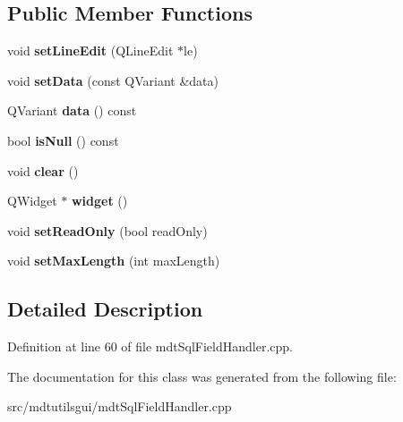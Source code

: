 \subsection*{Public Member Functions}
\begin{DoxyCompactItemize}
\item 
\hypertarget{classmdt_sql_field_handler_line_edit_a2b4477f48226a6e69faf3e3040da63b1}{
void {\bfseries setLineEdit} (QLineEdit $\ast$le)}
\label{classmdt_sql_field_handler_line_edit_a2b4477f48226a6e69faf3e3040da63b1}

\item 
\hypertarget{classmdt_sql_field_handler_line_edit_aabd6a72556f2389b9ea8cac1d26c0479}{
void {\bfseries setData} (const QVariant \&data)}
\label{classmdt_sql_field_handler_line_edit_aabd6a72556f2389b9ea8cac1d26c0479}

\item 
\hypertarget{classmdt_sql_field_handler_line_edit_a0c6a7f100ecadc373c55d2c590044da4}{
QVariant {\bfseries data} () const }
\label{classmdt_sql_field_handler_line_edit_a0c6a7f100ecadc373c55d2c590044da4}

\item 
\hypertarget{classmdt_sql_field_handler_line_edit_ad492eab28cb88bfe623ec3af04aeeb1f}{
bool {\bfseries isNull} () const }
\label{classmdt_sql_field_handler_line_edit_ad492eab28cb88bfe623ec3af04aeeb1f}

\item 
\hypertarget{classmdt_sql_field_handler_line_edit_ad41a3af3230333d74ac688a5e91354b4}{
void {\bfseries clear} ()}
\label{classmdt_sql_field_handler_line_edit_ad41a3af3230333d74ac688a5e91354b4}

\item 
\hypertarget{classmdt_sql_field_handler_line_edit_a475426ca27aea03d01f31c7d9c8bb5ba}{
QWidget $\ast$ {\bfseries widget} ()}
\label{classmdt_sql_field_handler_line_edit_a475426ca27aea03d01f31c7d9c8bb5ba}

\item 
\hypertarget{classmdt_sql_field_handler_line_edit_ab282e2ce51a42e55286111089526b6bb}{
void {\bfseries setReadOnly} (bool readOnly)}
\label{classmdt_sql_field_handler_line_edit_ab282e2ce51a42e55286111089526b6bb}

\item 
\hypertarget{classmdt_sql_field_handler_line_edit_a5a7599a112fd4d74ff0d50cb72e5998c}{
void {\bfseries setMaxLength} (int maxLength)}
\label{classmdt_sql_field_handler_line_edit_a5a7599a112fd4d74ff0d50cb72e5998c}

\end{DoxyCompactItemize}


\subsection{Detailed Description}


Definition at line 60 of file mdtSqlFieldHandler.cpp.



The documentation for this class was generated from the following file:\begin{DoxyCompactItemize}
\item 
src/mdtutilsgui/mdtSqlFieldHandler.cpp\end{DoxyCompactItemize}
